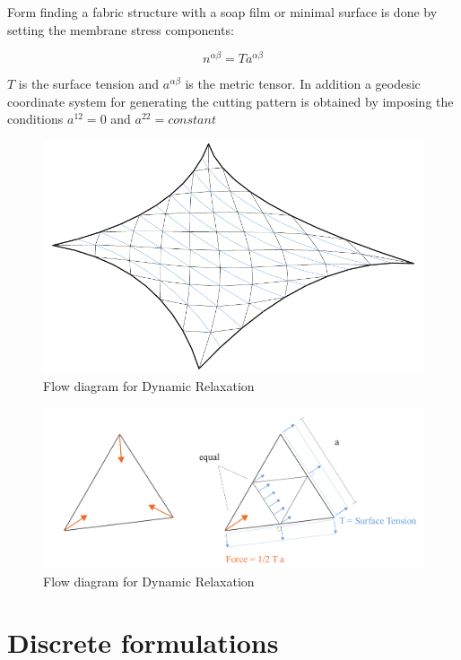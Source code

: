 Form finding a fabric structure with a soap film or minimal surface is done by setting the membrane stress components:

\begin{equation}
    n^{\alpha \beta} = Ta^{\alpha \beta}
\end{equation}

$T$ is the surface tension and $a^{\alpha \beta}$ is the metric tensor. In addition a geodesic coordinate system for generating the cutting pattern is obtained by imposing the conditions $a^{12} = 0$ and  $a^{22} = constant$


\begin{figure}[H]
\centering
\includegraphics[width=0.9\linewidth ]{figure/Theory/EqualMeshGeo.pdf}
\caption{Flow diagram for Dynamic Relaxation }
\end{figure}


\begin{figure}[H]
\centering
\includegraphics[width=1.0\linewidth ]{figure/Theory/SoapbubbleElement.pdf}
\caption{Flow diagram for Dynamic Relaxation }
\end{figure}

\section{Discrete formulations}
